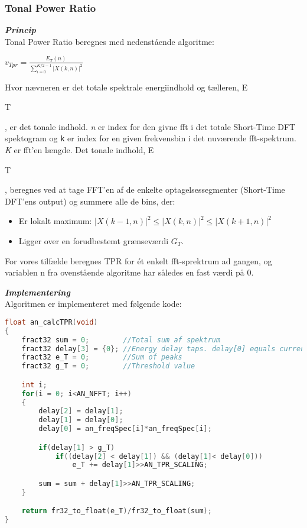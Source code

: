 \subsubsection{Tonal Power Ratio}
\textit{\textbf{Princip}} \\
Tonal Power Ratio beregnes med nedenstående algoritme: 
\begin{center}
${ v }_{ Tpr }=\frac { { E }_{ T }(n) }{ \sum _{ i=0 }^{ K/2-1 }{ { \left| X(k,n) \right|  }^{ 2 } }  } $
\end{center}
Hvor nævneren er det totale spektrale energiindhold og tælleren, E\begin{tiny}T\end{tiny}, er det tonale indhold. 
\textit{n} er index for den givne fft i det totale Short-Time DFT spektogram og \verb+k+ er index for en given frekvensbin i det nuværende fft-spektrum. \textit{K} er fft'en længde.
Det tonale indhold, E\begin{tiny}T\end{tiny}, beregnes ved at tage FFT'en af de enkelte optagelsessegmenter (Short-Time DFT'ens output) og summere alle de bins, der:
\begin{itemize}
	\item Er lokalt maximum: ${ \left| X(k-1,n) \right|  }^{ 2 }\le { \left| X(k,n) \right|  }^{ 2 }\le { \left| X(k+1,n) \right|  }^{ 2 }$
	\item Ligger over en forudbestemt grænseværdi ${ G }_{ T }$.
\end{itemize} 

For vores tilfælde beregnes TPR for ét enkelt fft-sprektrum ad gangen, og variablen n fra ovenstående algoritme har således en fast værdi på 0.

\textit{\textbf{Implementering}} \\
Algoritmen er implementeret med følgende kode:
\begin{lstlisting}[language=C,numbers=none]
float an_calcTPR(void)
{
    fract32 sum = 0;		//Total sum af spektrum
    fract32 delay[3] = {0};	//Energy delay taps. delay[0] equals current sample
    fract32 e_T = 0;		//Sum of peaks
    fract32 g_T = 0;		//Threshold value

    int i;
    for(i = 0; i<AN_NFFT; i++)
    {
        delay[2] = delay[1];
        delay[1] = delay[0];
        delay[0] = an_freqSpec[i]*an_freqSpec[i];

        if(delay[1] > g_T)
            if((delay[2] < delay[1]) && (delay[1]< delay[0]))
                e_T += delay[1]>>AN_TPR_SCALING;

        sum = sum + delay[1]>>AN_TPR_SCALING;
    }

    return fr32_to_float(e_T)/fr32_to_float(sum);
}
\end{lstlisting}

